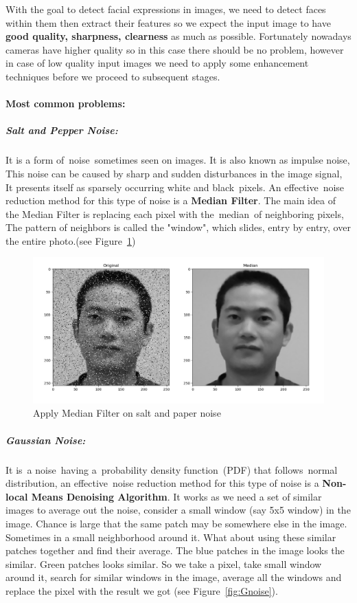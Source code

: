 With the goal to detect facial expressions in images, we need to detect faces within them then extract their features so we expect the input image to have \textbf{good quality, sharpness, clearness} as much as possible.\newline
Fortunately nowadays cameras have higher quality so in this case there should be no problem, however in case of low quality input images we need to apply some enhancement techniques before we proceed to subsequent stages.

\paragraph{Most common problems:}
\subparagraph{Salt and Pepper Noise:}
It is a form of noise sometimes seen on images. It is also known as impulse noise, This noise can be caused by sharp and sudden disturbances in the image signal, It presents itself as sparsely occurring white and black pixels.\newline
An effective noise reduction method for this type of noise is a \textbf{Median Filter}.\newline
The main idea of the Median Filter is  replacing each pixel with the median of neighboring pixels, The pattern of neighbors is called the "window", which slides, entry by entry, over the entire photo.(see Figure~\ref{fig:median})


\begin{figure}%
	\centering
	\includegraphics[width=.5\linewidth]{images/salt_pepper.jpg}
	\caption{Apply Median Filter on salt and paper noise}
	\label{fig:median}
\end{figure}

\subparagraph{Gaussian Noise:}
It is a noise having a probability density function (PDF) that follows normal distribution, an effective noise reduction method for this type of noise is a \textbf{Non-local Means Denoising Algorithm}.\newline
It works as we need a set of similar images to average out the noise, consider a small window (say 5x5 window) in the image. Chance is large that the same patch may be somewhere else in the image. Sometimes in a small neighborhood around it. What about using these similar patches together and find their average.\newline
The blue patches in the image looks the similar. Green patches looks similar. So we take a pixel, take small window around it, search for similar windows in the image, average all the windows and replace the pixel with the result we got (see Figure~\ref{fig:Gnoise}).\newline 

